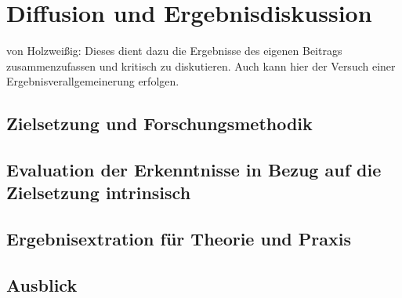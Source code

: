 \chapter{Diffusion und Ergebnisdiskussion}

von Holzweißig: Dieses dient dazu die Ergebnisse des eigenen Beitrags zusammenzufassen
und kritisch zu diskutieren. Auch kann hier der Versuch einer Ergebnisverallgemeinerung
erfolgen.

\section{Zielsetzung und Forschungsmethodik}
\section{Evaluation der Erkenntnisse in Bezug auf die Zielsetzung intrinsisch }
\section{Ergebnisextration für Theorie und Praxis}
\section{Ausblick}